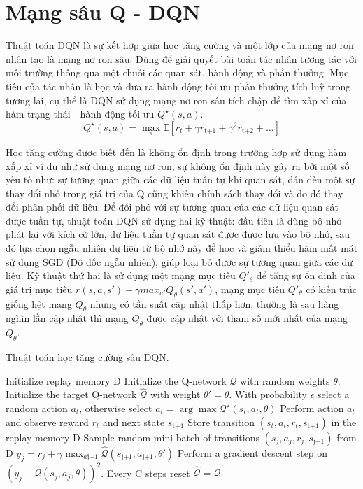 \documentclass{uetgraduation}
\begin{document}
\section{Mạng sâu Q - DQN}
Thuật toán DQN là sự kết hợp giữa học tăng cường và một lớp của mạng nơ ron nhân tạo là mạng nơ ron sâu. Dùng để giải quyết bài toán tác nhân tương tác với môi trường thông qua một
chuỗi các quan sát, hành động và phần thưởng. Mục tiêu của tác nhân là học và đưa ra hành động tối ưu phần thưởng tích luỹ trong tương lai, cụ thể là DQN sử dụng mạng nơ ron sâu tích chập
để tìm xấp xỉ của hàm trạng thái - hành động tối ưu $Q^\star (s, a)$.
\begin{equation}
    Q^\star (s, a) = \max_{\pi} \mathbb{E} [r_t + \gamma r_\text{t+1} + \gamma^2 r_\text{t+2} + \dots]
\end{equation}

Học tăng cường được biết đến là không ổn định trong trường hợp sử dụng hàm xấp xỉ ví dụ như sử dụng mạng nơ ron, sự không ổn định này gây ra bởi một số yếu tố như:
sự tương quan giữa các dữ liệu tuần tự khi quan sát, dẫn đến một sự thay đổi nhỏ trong giá trị của Q cũng khiến chính sách thay đổi và do đó thay đổi phân phối dữ liệu. Để đối phó với sự
tương quan của các dữ liệu quan sát được tuần tự, thuật toán DQN sử dụng hai kỹ thuật: đầu tiên là dùng bộ nhớ phát lại với kích cỡ lớn, dữ liệu tuần tự quan sát được được lưu vào bộ nhớ, sau đó lựa chọn
ngẫu nhiên dữ liệu từ bộ nhớ này để học và giảm thiểu hàm mất mát sử dụng SGD (Độ dốc ngẫu nhiên), giúp loại bỏ được sự tương quan giữa các dữ liệu. Kỹ thuật thứ hai là
sử dụng một mạng mục tiêu $Q'_\theta$ để tăng sự ổn định của giá trị mục tiêu $r(s, a, s') + \gamma max_{a'} Q_\theta (s', a')$, mạng mục tiêu $Q'_\theta$ có kiến trúc giống hệt mạng
$Q_\theta$ nhưng có tần suất cập nhật thấp hơn, thường là sau hàng nghìn lần cập nhật thì mạng $Q_\theta$ được cập nhật với tham số mới nhất của mạng $Q_\theta$.
\begin{algorithm}
    \caption{Thuật toán học tăng cường sâu DQN.}\label{alg:dqn_2}
    \begin{algorithmic}[1]
    \State Initialize replay memory D
    \State Initialize the Q-network $\mathcal{Q}$ with random weights $\theta$.
    \State Initialize the target Q-network $\hat{\mathcal{Q}}$ with weight $\theta' = \theta$.
        \State With probability $\epsilon$ select a random action $a_t$, otherwise select $a_t = \arg \max \mathcal{Q}^\star (s_t, a_t, \theta)$
        \State Perform action $a_t$ and observe reward $r_t$ and next state $s_\text{t+1}$
        \State Store transition $(s_t,a_t,r_t,s_\text{t+1})$ in the replay memory D
        \State Sample random mini-batch of transitions $(s_j,a_j,r_j,s_\text{j+1})$ from D
        \State $y_j = r_j + \gamma \max_{a\text{j+1}} \hat{\mathcal{Q}} (s_\text{j+1}, a_\text{j+1}, \theta')$
        \State Perform a gradient descent step on $(y_j - \mathcal{Q} (s_j, a_j, \theta))^2$.
        \State Every C steps reset $\hat{\mathcal{Q}} = \mathcal{Q}$
    \EndFor
\end{algorithmic}
\end{algorithm}
\end{document}
